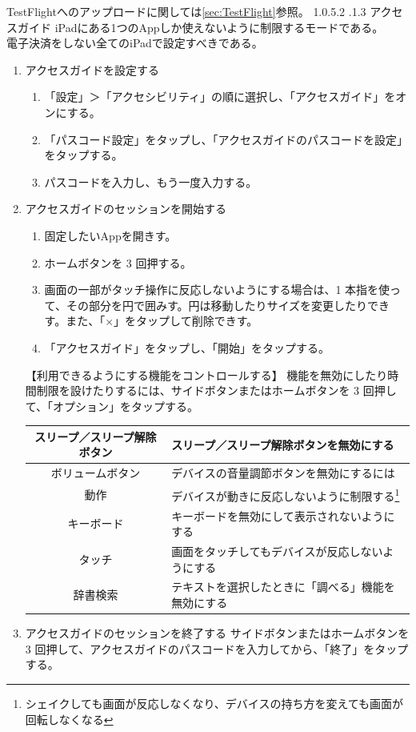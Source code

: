 \documentclass[dvipdfmx,jb5]{jarticle}
\makeatletter
\newcommand{\subsubsubsection}{\@startsection{paragraph}{4}{\z@}%
    {1.0\Cvs \@plus.5\Cdp \@minus.2\Cdp}%
    {.1\Cvs \@plus.3\Cdp}%
    {\large \bfseries}
  }
\makeatother
\begin{document}
  TestFlightへのアップロードに関しては\ref{sec:TestFlight}参照。
  \subsubsubsection{アクセスガイド}
  iPadにある1つのAppしか使えないように制限するモードである。\\
  電子決済をしない全てのiPadで設定すべきである。
  \begin{enumerate}
   \item アクセスガイドを設定する
   \begin{enumerate}[手順1.]
    \item 「設定」＞「アクセシビリティ」の順に選択し、「アクセスガイド」をオンにする。
    \item 「パスコード設定」をタップし、「アクセスガイドのパスコードを設定」をタップする。
    \item パスコードを入力し、もう一度入力する。
   \end{enumerate}
   \item アクセスガイドのセッションを開始する
   \begin{enumerate}[手順1.]
    \item 固定したいAppを開きす。
    \item ホームボタンを 3 回押する。
    \item 画面の一部がタッチ操作に反応しないようにする場合は、1 本指を使って、その部分を円で囲みす。円は移動したりサイズを変更したりできす。また、「$\times$」をタップして削除できす。
    \item 「アクセスガイド」をタップし、「開始」をタップする。
   \end{enumerate}
   \begin{itembox}[l]{【利用できるようにする機能をコントロールする】}
    機能を無効にしたり時間制限を設けたりするには、サイドボタンまたはホームボタンを 3 回押して、「オプション」をタップする。
    \begin{center}
    \begin{tabular}{|c|l|}\hline
     スリープ／スリープ解除ボタン&スリープ／スリープ解除ボタンを無効にする\\ \hline
     ボリュームボタン&デバイスの音量調節ボタンを無効にするには\\ \hline
     動作&デバイスが動きに反応しないように制限する\footnote{シェイクしても画面が反応しなくなり、デバイスの持ち方を変えても画面が回転しなくなる}\\ \hline
     キーボード&キーボードを無効にして表示されないようにする\\ \hline
     タッチ&画面をタッチしてもデバイスが反応しないようにする\\ \hline
     辞書検索&テキストを選択したときに「調べる」機能を無効にする\\ \hline
    \end{tabular}
    \end{center}
   \end{itembox}
   \item アクセスガイドのセッションを終了する
   サイドボタンまたはホームボタンを 3 回押して、アクセスガイドのパスコードを入力してから、「終了」をタップする。
  \end{enumerate}
\end{document}

